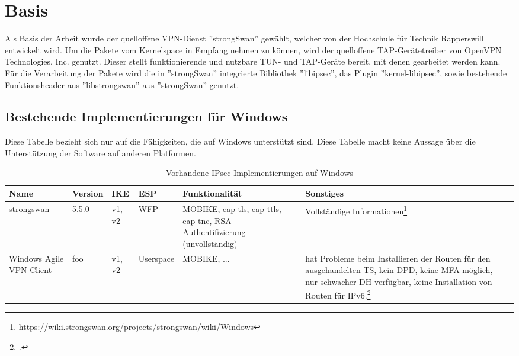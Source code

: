 


\section{Basis}
Als Basis der Arbeit wurde der quelloffene VPN-Dienst ''strongSwan'' gewählt,
welcher von der Hochschule für Technik Rapperswill entwickelt wird.
Um die Pakete vom Kernelspace in Empfang nehmen zu können, wird der quelloffene
TAP-Gerätetreiber von OpenVPN Technologies, Inc. genutzt. Dieser stellt funktionierende
und nutzbare TUN- und TAP-Geräte bereit, mit denen gearbeitet werden kann.
Für die Verarbeitung der Pakete wird die in ''strongSwan'' integrierte Bibliothek ''libipsec'',
das Plugin ''kernel-libipsec'', sowie bestehende Funktionsheader aus ''libstrongswan''
aus ''strongSwan'' genutzt.

\subsection{Bestehende Implementierungen für Windows}

Diese Tabelle bezieht sich nur auf die Fähigkeiten, die auf Windows unterstützt sind.
Diese Tabelle macht keine Aussage über die Unterstützung der Software auf anderen Platformen.
\begin{table}[h]
\caption{Vorhandene IPsec-Implementierungen auf Windows }
\begin{tabular*}{\textwidth}{|p{2cm}|p{1cm}|p{1cm}|p{2cm}|p{2cm}|p{4cm}|p{4cm}|}\firsthline
Name & Version & IKE & ESP & Funktionalität & Sonstiges \\ \hline 
strongswan & 5.5.0 & v1, v2 & \ac{WFP} & MOBIKE, eap-tls, eap-ttls, eap-tnc, RSA-Authentifizierung (unvollständig) & Vollständige Informationen\footnote{\url{https://wiki.strongswan.org/projects/strongswan/wiki/Windows}} \\ \hline 
Windows Agile VPN Client & foo & v1, v2 & Userspace & MOBIKE, ... & hat Probleme beim Installieren der Routen für den ausgehandelten \ac{TS}, kein \ac{DPD}, keine \ac{MFA} möglich, nur schwacher \ac{DH} verfügbar, keine Installation von Routen für IPv6.\footcite{_windows7_2016} \\ \hline 
\end{tabular*}
\label{tab:IPsec-Implementierungen}
\end{table}
